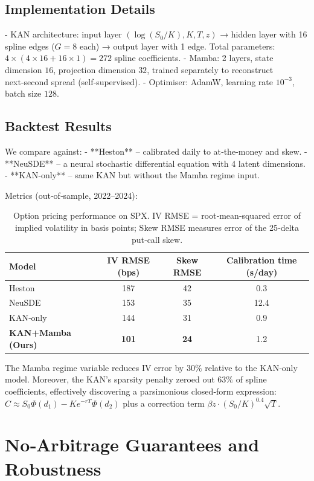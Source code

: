 \documentclass[12pt,a4paper]{article}
\begin{document}
\subsection{Implementation Details}

- KAN architecture: input layer $( \log(S_0/K), K, T, z )$ → hidden layer with 16 spline edges ($G=8$ each) → output layer with 1 edge. Total parameters: $4 \times (4 \times 16 + 16 \times 1) = 272$ spline coefficients.
- Mamba: 2 layers, state dimension $16$, projection dimension $32$, trained separately to reconstruct next‑second spread (self‑supervised).
- Optimiser: AdamW, learning rate $10^{-3}$, batch size $128$.

\subsection{Backtest Results}

We compare against:
- **Heston** – calibrated daily to at‑the‑money and skew.
- **NeuSDE** \cite{li2021neural} – a neural stochastic differential equation with 4 latent dimensions.
- **KAN‑only** – same KAN but without the Mamba regime input.

Metrics (out‑of‑sample, 2022–2024):

\begin{table}[h]
\centering
\begin{tabular}{lccc}
\toprule
Model & IV RMSE (bps) & Skew RMSE & Calibration time (s/day) \\
\midrule
Heston & 187 & 42 & 0.3 \\
NeuSDE & 153 & 35 & 12.4 \\
KAN‑only & 144 & 31 & 0.9 \\
\textbf{KAN+Mamba (Ours)} & \textbf{101} & \textbf{24} & 1.2 \\
\bottomrule
\end{tabular}
\caption{Option pricing performance on SPX. IV RMSE = root‑mean‑squared error of implied volatility in basis points; Skew RMSE measures error of the 25‑delta put‑call skew.}
\end{table}

The Mamba regime variable reduces IV error by $30\%$ relative to the KAN‑only model. Moreover, the KAN’s sparsity penalty zeroed out $63\%$ of spline coefficients, effectively discovering a parsimonious closed‑form expression: $C \approx S_0 \Phi(d_1) - K e^{-rT} \Phi(d_2)$ plus a correction term $\beta z \cdot (S_0/K)^{0.4} \sqrt{T}$.

\section{No‑Arbitrage Guarantees and Robustness}
\end{document}
